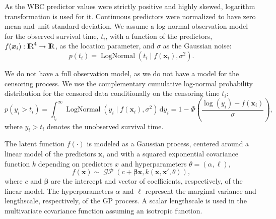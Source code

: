 \documentclass[onecolumn,a4paper,11pt]{article}
\DeclareMathOperator{\LogNormal}{LogNormal}
\DeclareMathOperator{\GP}{\mathcal{GP}}
\begin{document}
As the WBC predictor values were strictly positive and highly skewed, logarithm transformation is used for it. Continuous predictors were normalized to have zero mean and unit standard deviation. %
We assume a log-normal observation model for the observed survival time, $t_i$, with a function of the predictors, $f(\bm{x}_i):{\rm I\!R}^4 \to {\rm I\!R}$, as the location parameter, and $\sigma$ as the Gaussian noise: 
%
\begin{equation*}
  p(t_i)= \LogNormal(t_i \mid f(\bm{x}_i),\sigma^2).
\end{equation*}

We do not have a full observation model, as we do not have a model for the censoring process. We use the complementary cumulative log-normal probability distribution for the censored data conditionally on the censoring time $t_i$:
%
\begin{equation*}
p(y_i > t_i)= \int_{t_i}^{\infty} \LogNormal(y_i \mid f(\bm{x}_i),\sigma^2) \,\mathrm{d}y_i=  1 - \Phi\! \left( \frac{\log(y_i)-f(\bm{x}_i)}{\sigma} \right),
\end{equation*}
%
where $y_i>t_i$ denotes the unobserved survival time.

The latent function $f(\cdot)$ is modeled as a Gaussian process, centered around a linear model of the predictors $\bm{x}$, and with a squared exponential covariance function $k$ depending on predictors $x$ and hyperparameters $\theta=(\alpha,\ell)$,
%
\begin{equation*} 
f(\bm{x}) \sim \GP(c + \bm{\beta}\bm{x}, k(\bm{x},\bm{x}', \theta)),
\end{equation*}
where $c$ and $\bm{\beta}$ are the intercept and vector of coefficients, respectively, of the linear model.
The hyperparameters $\alpha$ and $\ell$ represent the marginal variance and lengthscale, respectively, of the GP process. A scalar lengthscale is used in the multivariate covariance function assuming an isotropic function.
\end{document}
